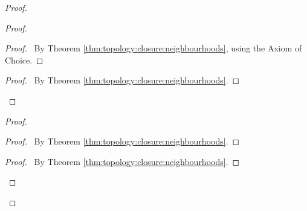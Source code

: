 \documentclass{report}
\let\qed\relax
\theoremstyle{definition}
\begin{document}
  \begin{proof}
    \pf
    \begin{proof}
      \begin{proof}
        \pf\ By Theorem \ref{thm:topology:closure:neighbourhoods}, using the
        Axiom of Choice.
      \end{proof}
      \qedstep
      \begin{proof}
        \pf\ By Theorem \ref{thm:topology:closure:neighbourhoods}.
      \end{proof}
    \end{proof}
    \begin{proof}
      \begin{proof}
        \pf\ By Theorem \ref{thm:topology:closure:neighbourhoods}.
      \end{proof}
      \qedstep
      \begin{proof}
        \pf\ By Theorem \ref{thm:topology:closure:neighbourhoods}.
      \end{proof}
    \end{proof}
    \qed
  \end{proof}
\end{document}
